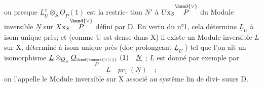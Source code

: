  ou presque $\underline{L}^{x}_{U}\otimes_S\underline{O}_P(1)$ est   la restric-%
tion $\underline{N}'$ à $U\mathrm{x}_S\overset{\hand{\vee}}{P}$  du  Module inversible $\underline{N}$  sur $X\mathrm{x}_S\overset{\hand{\vee}}{P}$  défini par D. En vertu
du  n°1, cela détermine  $\underline{L}_U$  à isom unique près;
et  (comme U est dense dans X)  il existe  un Module inversible $\underline{L}$ sur X,
déterminé à isom unique près (doc prolongeant $\underline{L}_U$ ) tel que  l'on ait
un isomorphisme  $\underline{L}\otimes_{\underline{O}_S}\underline{O}_{\overset{\hand{\unsure{\vee|/}}}{P}}\ (1) \quad \underline{N}$ ;  $\underline{L}$  est donné par exemple par
\[ \underline{L} \quad pr_1\ (\underline{N}) \quad ; \]
on l'appelle  le Module inversible sur X associé au systême lin de divi-%
suurs D.

